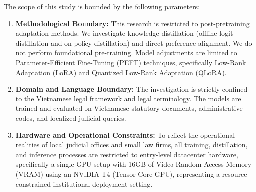 The scope of this study is bounded by the following parameters:
\begin{enumerate}
    \item \textbf{Methodological Boundary:} This research is restricted to post-pretraining adaptation methods. We investigate knowledge distillation (offline logit distillation and on-policy distillation) and direct preference alignment. We do not perform foundational pre-training. Model adjustments are limited to Parameter-Efficient Fine-Tuning (PEFT) techniques, specifically Low-Rank Adaptation (LoRA) and Quantized Low-Rank Adaptation (QLoRA).
    \item \textbf{Domain and Language Boundary:} The investigation is strictly confined to the Vietnamese legal framework and legal terminology. The models are trained and evaluated on Vietnamese statutory documents, administrative codes, and localized judicial queries.
    \item \textbf{Hardware and Operational Constraints:} To reflect the operational realities of local judicial offices and small law firms, all training, distillation, and inference processes are restricted to entry-level datacenter hardware, specifically a single GPU setup with 16GB of Video Random Access Memory (VRAM) using an NVIDIA T4 (Tensor Core GPU), representing a resource-constrained institutional deployment setting.
\end{enumerate}
